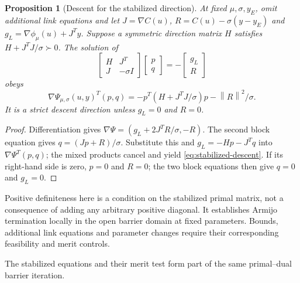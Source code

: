 \documentclass[pdflatex,sn-mathphys-num]{sn-jnl}
\theoremstyle{thmstyleone}
\newtheorem{proposition}[theorem]{Proposition}
\theoremstyle{thmstylethree}
\newcommand{\R}{\mathbb R}
\newcommand{\norm}[1]{\left\lVert#1\right\rVert}
\begin{document}
\begin{proposition}[Descent for the stabilized direction]\label{prop:stabilized-descent}
At fixed $\mu,\sigma,y_E$, omit additional link equations and let
$J=\nabla C(u)$, $R=C(u)-\sigma(y-y_E)$ and
$g_L=\nabla\phi_\mu(u)+J^Ty$. Suppose a symmetric direction matrix
$H$ satisfies $H+J^TJ/\sigma\succ0$. The solution of
\[
 \begin{bmatrix}H&J^T\\J&-\sigma I\end{bmatrix}
 \begin{bmatrix}p\\q\end{bmatrix}=-\begin{bmatrix}g_L\\R\end{bmatrix}
\]
obeys
\begin{equation}\label{eq:stabilized-descent}
 \nabla\Psi_{\mu,\sigma}(u,y)^T(p,q)
 =-p^T(H+J^TJ/\sigma)p-\norm{R}^2/\sigma.
\end{equation}
It is a strict descent direction unless $g_L=0$ and $R=0$.
\end{proposition}
\begin{proof}
Differentiation gives
$\nabla\Psi=(g_L+2J^TR/\sigma,-R)$. The second block equation
gives $q=(Jp+R)/\sigma$. Substitute this and
$g_L=-Hp-J^Tq$ into $\nabla\Psi^T(p,q)$; the mixed products cancel
and yield \eqref{eq:stabilized-descent}. If its right-hand side is zero,
$p=0$ and $R=0$; the two block equations then give $q=0$ and $g_L=0$.
\end{proof}

Positive definiteness here is a condition on the stabilized primal
matrix, not a consequence of adding any arbitrary positive diagonal.
It establishes Armijo termination locally in the open barrier domain
at fixed parameters. Bounds, additional link equations and parameter
changes require their corresponding feasibility and merit controls.

The stabilized equations and their merit test form part of the same
primal--dual barrier iteration.


\FloatBarrier
\end{document}
